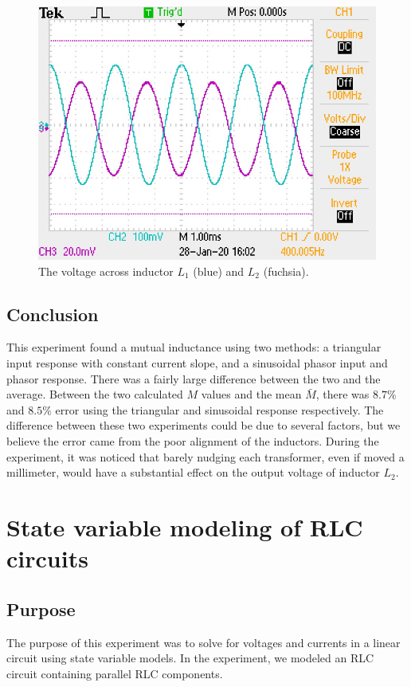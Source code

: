 \documentclass{report}
\begin{document}
\begin{figure}[H]
	\centering
	\includegraphics[width=0.5\linewidth]{scope/dot}
	\caption{The voltage across inductor $L_1$ (blue) and $L_2$ (fuchsia).}
	\label{fig:1dot}
\end{figure}

\subsection{Conclusion}
This experiment found a mutual inductance using two methods: a triangular input response with constant current slope, and a sinusoidal phasor input and phasor response. There was a fairly large difference between the two and the average. Between the two calculated $M$ values and the mean $\bar{M}$, there was $8.7\%$ and $8.5\%$ error using the triangular and sinusoidal response respectively. The difference between these two experiments could be due to several factors, but we believe the error came from the poor alignment of the inductors. During the experiment, it was noticed that barely nudging each transformer, even if moved a millimeter, would have a substantial effect on the output voltage of inductor $L_2$.


\pagebreak

\section{State variable modeling of RLC circuits}

\subsection{Purpose}
The purpose of this experiment was to solve for voltages and currents in a linear circuit using state variable models. In the experiment, we modeled an RLC circuit containing parallel RLC components.
\end{document}

